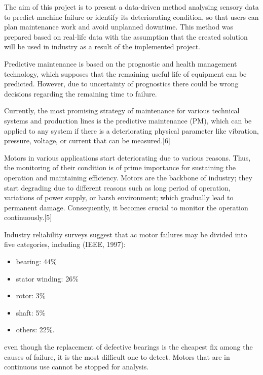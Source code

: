 The aim of this project is to present a data-driven method analysing sensory data to predict machine failure or identify its deteriorating condition, so that users can plan maintenance work and avoid unplanned downtime. This method was prepared based on real-life data with the assumption that the created solution will be used in industry as a result of the implemented project. 

Predictive maintenance is based on the prognostic and health management technology, which supposes that the remaining useful life of equipment can be predicted. However, due to uncertainty of prognostics there could be wrong decisions regarding the remaining time to failure. 

Currently, the most promising strategy of maintenance for various technical systems and production lines is the predictive maintenance (PM), which can be applied to any system if there is a deteriorating physical parameter like vibration, pressure, voltage, or current that can be measured.[6] 

Motors in various applications start deteriorating due to various reasons. Thus, the monitoring of their condition is of prime importance for sustaining the operation and maintaining efficiency. Motors are the backbone of industry; they start degrading due to different reasons such as long period of operation, variations of power supply, or harsh environment; which gradually lead to permanent damage. Consequently, it becomes crucial to monitor the operation continuously.[5] 

Industry reliability surveys suggest that ac motor failures may be divided into five categories, including (IEEE, 1997): 

\begin{itemize}
	\item bearing: 44\% 
	
	\item stator winding: 26\% 
	
	\item rotor: 3\% 
	
	\item shaft: 5\% 
	
	\item others: 22\%. 
\end{itemize}


even though the replacement of defective bearings is the cheapest fix among the causes of failure, it is the most difficult one to detect. Motors that are in continuous use cannot be stopped for analysis. 



